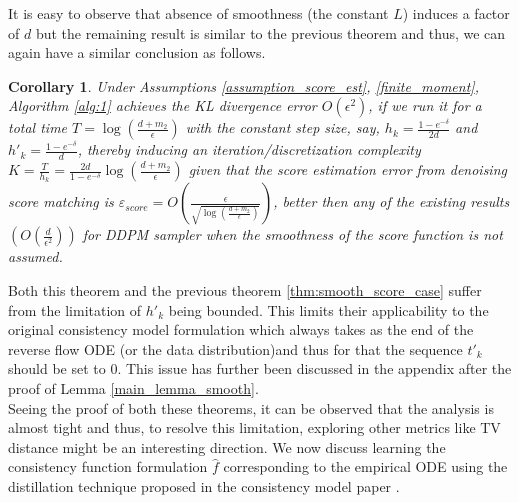 \documentclass[11pt]{article}
\newcommand{\xh}[1]{\textcolor[HTML]{66CCFF}{#1}}
\newtheorem{corollary}[lemma]{Corollary}
\begin{document}
\noindent
It is easy to observe that absence of smoothness (the constant $L$) induces a factor of $d$ but the remaining result is similar to the previous theorem and thus, we can again have a similar conclusion as follows.

\begin{corollary}
Under Assumptions \ref{assumption_score_est}, \ref{finite_moment}, Algorithm \ref{alg:1} achieves the KL divergence error $O(\epsilon^2)$, if we run it for a total time $T= \log(\frac{d+m_2}{\epsilon})$
    with the constant step size, say, $h_k = \frac{1-e^{-\delta}}{2d}$ and $h'_k = \frac{1-e^{-\delta}}{d}$, thereby inducing an iteration/discretization complexity $K = \frac{T}{h_k} = \frac{2d}{1-e^{-\delta}}\log(\frac{d+m_2}{\epsilon})$ given that the score estimation error from denoising score matching is $\varepsilon_{score} = O\left(\frac{\epsilon}{\sqrt{\log(\frac{d+m_2}{\epsilon})}}\right)$, better then any of the existing results \cite{benton2023nearly} $\left(O\left(\frac{d}{\epsilon^2}\right)\right)$ for DDPM \cite{ho2020denoising} sampler when the smoothness of the score function is not assumed.
    
\end{corollary}

\noindent
Both this theorem and the previous theorem \ref{thm:smooth_score_case} suffer from the limitation of $h'_k$ being bounded. This limits their applicability to the original consistency model formulation \cite{song2023consistency} which always takes as the end of the reverse flow ODE (or the data distribution)and thus for that the sequence $t'_k$ should be set to 0. This issue has further been discussed in the appendix after the proof of Lemma \ref{main_lemma_smooth}.\\
Seeing the proof of both these theorems, it can be observed that the analysis is almost tight and thus, to resolve this limitation, exploring other metrics like TV distance might be an interesting direction. 
 We now discuss learning the consistency function formulation $\hat{f}$ corresponding to the empirical ODE using the distillation technique proposed in the consistency model paper \cite{song2023consistency}.

\end{document}
